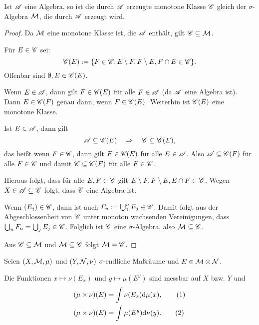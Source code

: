 \documentclass[
 a4paper,
 12pt,
 parskip=half
 ]{scrreprt}
\theoremstyle{plain}
\theoremstyle{definition}
\numberwithin{equation}{section}
\begin{document}
\begin{lem}
 Ist $\mathscr{A}$ eine Algebra, so ist die durch $\mathscr{A}$ erzeugte monotone Klasse $\mathscr{C}$ gleich der $\sigma$-Algebra $\mathcal{M}$, die durch $\mathscr{A}$ erzeugt wird.
\end{lem}

\begin{proof}
 Da $\mathcal{M}$ eine monotone Klasse ist, die $\mathscr{A}$ enthält, gilt $\mathscr{C} \subseteq \mathcal{M}$. 
 
 Für $E \in \mathscr{C}$ sei:
 \[ \mathscr{C}(E) := \{ F \in \mathscr{C}; E \setminus F, F \setminus E, F \cap E \in \mathscr{C} \}. \]
 Offenbar sind $\emptyset, E \in \mathscr{C}(E)$.
 
 Wenn $E \in \mathscr{A}$, dann gilt $F \in \mathscr{C}(E)$ für alle $F \in \mathscr{A}$ (da $\mathscr{A}$ eine Algebra ist). Dann $E \in \mathscr{C}(F)$ genau dann, wenn $F \in \mathscr{C}(E)$. Weiterhin ist $\mathscr{C}(E)$ eine monotone Klasse. 
 
 Ist $E \in \mathscr{A}$, dann gilt 
 \[ \mathscr{A} \subseteq \mathscr{C}(E) \quad \Rightarrow \quad \mathscr{C} \subseteq \mathscr{C}(E), \]
 das heißt wenn $F \in \mathscr{C}$, dann gilt $F \in \mathscr{C}(E)$ für alle $E \in \mathscr{A}$. Also $\mathscr{A} \subseteq \mathscr{C}(F)$ für alle $F \in \mathscr{C}$ und damit $\mathscr{C} \subseteq \mathscr{C}(F)$ für alle $F \in \mathscr{C}$.
 
 Hieraus folgt, dass für alle $E,F \in \mathscr{C}$ gilt $E \setminus F, F \setminus E, E \cap F \in \mathscr{C}$. Wegen $X \in \mathscr{A} \subseteq \mathscr{C}$ folgt, dass $\mathscr{C}$ eine Algebra ist. 
 
 Wenn $(E_j) \in \mathscr{C}$, dann ist auch $F_n := \bigcup_1^n E_j \in \mathscr{C}$. Damit folgt aus der Abgeschlossenheit von $\mathscr{C}$ unter monoton wachsenden Vereinigungen, dass $\bigcup_n F_n = \bigcup_j E_j \in \mathscr{C}$. Folglich ist $\mathscr{C}$ eine $\sigma$-Algebra, also $\mathcal{M} \subseteq \mathscr{C}$.
 
 Aus $\mathscr{C} \subseteq \mathcal{M}$ und $\mathcal{M} \subseteq \mathscr{C}$ folgt $\mathcal{M} = \mathscr{C}$.
\end{proof}

\begin{thm}
 Seien $(X,\mathcal{M},\mu)$ und $(Y,\mathcal{N},\nu)$ $\sigma$-endliche Maßräume und $E \in \mathcal{M} \otimes \mathcal{N}$.
 
 Die Funktionen $x \mapsto \nu(E_x)$ und $y \mapsto \mu(E^y)$ sind messbar auf $X$ bzw. $Y$ und
 \begin{align*}
  (\mu \times\nu)(E) &= \int \nu(E_x) \mathrm{d} \mu(x), \tag{1} \\
  (\mu \times\nu)(E) &= \int \mu(E^y) \mathrm{d} \nu(y). \tag{2}
 \end{align*}
\end{thm}
\end{document}
